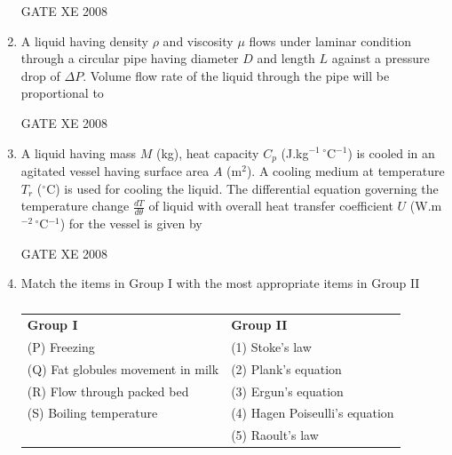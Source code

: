\documentclass[12pt]{article}
\begin{document}
\begin{enumerate}
GATE XE 2008  

\item A liquid having density $\rho$ and viscosity $\mu$ flows under laminar condition through a circular pipe having diameter $D$ and length $L$ against a pressure drop of $\Delta P$. Volume flow rate of the liquid through the pipe will be proportional to  

\begin{enumerate}
\end{enumerate}

GATE XE 2008  

\item  A liquid having mass $M$ (kg), heat capacity $C_p$ (J.kg$^{-1} \, ^\circ$C$^{-1}$) is cooled in an agitated vessel having surface area $A$ (m$^2$). A cooling medium at temperature $T_r$ ($^\circ$C) is used for cooling the liquid. The differential equation governing the temperature change $\frac{dT}{d\theta}$ of liquid with overall heat transfer coefficient $U$ (W.m$^{-2} \, ^\circ$C$^{-1}$) for the vessel is given by  

\begin{enumerate}
\end{enumerate}

GATE XE 2008  

\item  Match the items in Group I with the most appropriate items in Group II  

\begin{table}[H]     \centering     \caption{}     \label{}     \begin{tabular}{p{7cm} p{7cm}}
\textbf{Group I} & \textbf{Group II} \\
(P) Freezing & (1) Stoke's law \\
(Q) Fat globules movement in milk & (2) Plank's equation \\
(R) Flow through packed bed & (3) Ergun's equation \\
(S) Boiling temperature & (4) Hagen Poiseulli's equation \\
& (5) Raoult's law \\
\end{tabular} \end{table}  


\end{enumerate}
\end{document}
